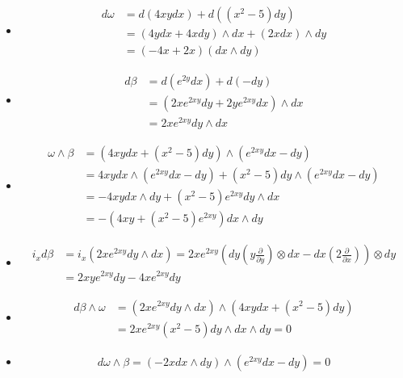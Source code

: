 \documentclass{article}
\begin{document}
\begin{itemize}
  \item 
  \begin{align*}
    d\omega &= d(4xy dx ) + d((x^2-5)dy)\\
       &= (4ydx + 4x dy) \land dx + (2x dx)\land dy \\
       &= (-4x + 2x ) (dx \land dy)
  \end{align*}
  \item 
  \begin{align*}
    d\beta &= d(e ^ {2y } dx ) + d(-dy)\\
       &= (2x e ^ {2xy }dy + 2y e ^ {2xy }dx )\land dx \\
       &= 2x e ^ {2xy } dy \land dx 
  \end{align*}
  \item 
  \begin{align*}
    \omega \land \beta &= (4xy dx + (x^2 - 5) dy ) \land (e ^ {2xy }dx - dy ) \\
    &= 4xydx\land(e ^ {2xy }dx - dy ) + (x^2 - 5) dy \land (e ^ {2xy }dx - dy ) \\
    &= - 4xy dx \land dy + (x^2 - 5) e ^ {2xy }dy\land dx \\
    &= -(4xy + (x^2 - 5)e ^ {2xy })dx \land dy 
  \end{align*}
  \item 
  \begin{align*}
    i_x d\beta &= i _{x } (2x e ^ {2xy } dy \land dx) = 2x e ^ {2xy } (dy(y \frac{\partial  }{\partial y })\otimes dx - dx (2 \frac{\partial  }{\partial x }))\otimes dy \\
          &= 2xy e ^ {2xy }dy - 4 x e ^ {2xy }dy 
  \end{align*}
  \item 
  \begin{align*}
    d\beta \land \omega &= (2x e ^ {2xy } dy \land dx ) \land (4xy dx + (x^2 - 5) dy ) \\
    &= 2x e ^ {2xy }(x^2 - 5 )dy \land dx \land dy = 0 
  \end{align*}
  \item 
  \begin{align*}
    d\omega \land \beta = (-2x dx \land dy ) \land (e ^ {2xy } dx - dy ) = 0 
  \end{align*}
\end{itemize}

\end{document}
